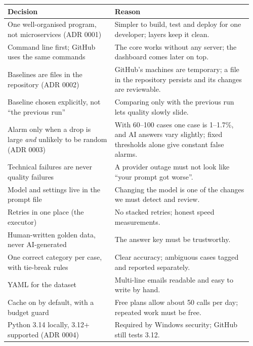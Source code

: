 \documentclass[11pt,a4paper]{article}
\begin{document}
\begin{longtable}{@{}p{0.42\linewidth}p{0.54\linewidth}@{}}
\toprule
\textbf{Decision} & \textbf{Reason} \\
\midrule
\endhead
One well-organised program, not microservices (ADR 0001) & Simpler to build, test and deploy for one developer; layers keep it clean. \\
Command line first; GitHub uses the same commands & The core works without any server; the dashboard comes later on top. \\
Baselines are files in the repository (ADR 0002) & GitHub's machines are temporary; a file in the repository persists and its changes are reviewable. \\
Baseline chosen explicitly, not ``the previous run'' & Comparing only with the previous run lets quality slowly slide. \\
Alarm only when a drop is large \emph{and} unlikely to be random (ADR 0003) & With 60--100 cases one case is 1--1.7\%, and AI answers vary slightly; fixed thresholds alone give constant false alarms. \\
Technical failures are never quality failures & A provider outage must not look like ``your prompt got worse''. \\
Model and settings live in the prompt file & Changing the model is one of the changes we must detect and review. \\
Retries in one place (the executor) & No stacked retries; honest speed measurements. \\
Human-written golden data, never AI-generated & The answer key must be trustworthy. \\
One correct category per case, with tie-break rules & Clear accuracy; ambiguous cases tagged and reported separately. \\
YAML for the dataset & Multi-line emails readable and easy to write by hand. \\
Cache on by default, with a budget guard & Free plans allow about 50 calls per day; repeated work must be free. \\
Python 3.14 locally, 3.12+ supported (ADR 0004) & Required by Windows security; GitHub still tests 3.12. \\
\bottomrule
\end{longtable}

\end{document}
